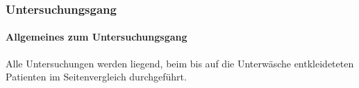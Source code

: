 \subsubsection{Untersuchungsgang}
\paragraph{Allgemeines zum Untersuchungsgang}

Alle Untersuchungen werden liegend, beim bis auf die
Unterwäsche entkleideteten Patienten im Seitenvergleich
durchgeführt.






% 
% 
% 
% 
% 
% 











% 
% 
% 
% 
% 
% 
% 
% 
% 
% 
% 




